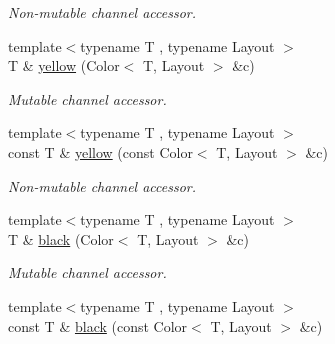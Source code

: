 \begin{DoxyCompactItemize}
\begin{DoxyCompactList}\small\item\em Non-\/mutable channel accessor. \end{DoxyCompactList}\item 
\hypertarget{group___channel_accessors_ga6829ee374a312a1029a0148235540de3}{{\footnotesize template$<$typename T , typename Layout $>$ }\\T \& \hyperlink{group___channel_accessors_ga6829ee374a312a1029a0148235540de3}{yellow} (Color$<$ T, Layout $>$ \&c)}\label{group___channel_accessors_ga6829ee374a312a1029a0148235540de3}

\begin{DoxyCompactList}\small\item\em Mutable channel accessor. \end{DoxyCompactList}\item 
\hypertarget{group___channel_accessors_gac23bd53f11255e8179ab89bf48d050d1}{{\footnotesize template$<$typename T , typename Layout $>$ }\\const T \& \hyperlink{group___channel_accessors_gac23bd53f11255e8179ab89bf48d050d1}{yellow} (const Color$<$ T, Layout $>$ \&c)}\label{group___channel_accessors_gac23bd53f11255e8179ab89bf48d050d1}

\begin{DoxyCompactList}\small\item\em Non-\/mutable channel accessor. \end{DoxyCompactList}\item 
\hypertarget{group___channel_accessors_ga18f2660186c9e25f69ed6fe2d474752c}{{\footnotesize template$<$typename T , typename Layout $>$ }\\T \& \hyperlink{group___channel_accessors_ga18f2660186c9e25f69ed6fe2d474752c}{black} (Color$<$ T, Layout $>$ \&c)}\label{group___channel_accessors_ga18f2660186c9e25f69ed6fe2d474752c}

\begin{DoxyCompactList}\small\item\em Mutable channel accessor. \end{DoxyCompactList}\item 
\hypertarget{group___channel_accessors_gab36760b6e747c3cdcb47643dce670493}{{\footnotesize template$<$typename T , typename Layout $>$ }\\const T \& \hyperlink{group___channel_accessors_gab36760b6e747c3cdcb47643dce670493}{black} (const Color$<$ T, Layout $>$ \&c)}\label{group___channel_accessors_gab36760b6e747c3cdcb47643dce670493}


\end{DoxyCompactItemize}
